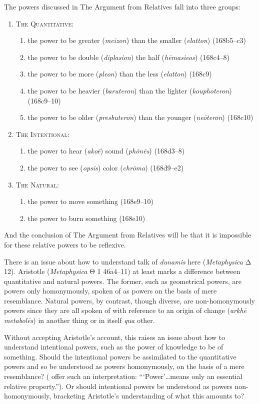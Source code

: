 The powers discussed in The Argument from Relatives fall into three groups:
\begin{enumerate}[(1)]
	\item \textsc{The Quantitative}:
	\begin{enumerate}
		\item the power to be greater (\emph{meizon}) than the smaller (\emph{elatton}) (168b5–c3)
		\item the power to be double (\emph{diplasion}) the half (\emph{hēmasieos}) (168c4–8)
		\item the power to be more (\emph{pleon}) than the less (\emph{elatton}) (168c9)
		\item the power to be heavier (\emph{baruteron}) than the lighter (\emph{kouphoteron}) (168c9–10)
		\item the power to be older (\emph{presbuteron}) than the younger (\emph{neōteron}) (168c10)
	\end{enumerate}
	\item \textsc{The Intentional}:
	\begin{enumerate}
		\item the power to hear (\emph{akoē}) sound (\emph{phōnēs}) (168d3–8)
		\item the power to see (\emph{opsis}) color (\emph{chrōma}) (168d9–e2)
	\end{enumerate}
	\item \textsc{The Natural}:
	\begin{enumerate}
		\item the power to move something (168e9–10)
		\item the power to burn something (168e10)
	\end{enumerate}
\end{enumerate}
And the conclusion of The Argument from Relatives will be that it is impossible for these relative powers to be reflexive.

There is an issue about how to understand talk of \emph{dunamis} here (\emph{Metaphysica} {\sbl Δ} 12). Aristotle (\emph{Metaphysica} {\sbl Θ} 1 46a4–11) at least marks a difference between quantitative and natural powers. The former, such as geometrical powers, are powers only homonymously, spoken of as powers on the basis of mere resemblance. Natural powers, by contrast, though diverse, are non-homonymously powers since they are all spoken of with reference to an origin of change (\emph{arkhē metabolēs}) in another thing or in itself \emph{qua} other. 

Without accepting Aristotle's account, this raises an issue about how to understand intentional powers, such as the power of knowledge to be of something. Should the intentional powers be assimilated to the quantitative powers and so be understood as powers homonymously, on the basis of a mere resemblance? (\citealt[24 n74]{Moore:2019aa} offer such an interpretation: ```Power'\ldots means only an essential relative property.''). Or should intentional powers be understood as powers non-homonymously, bracketing Aristotle's understanding of what this amounts to? 


